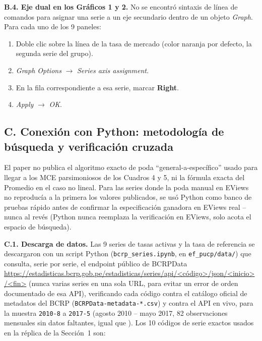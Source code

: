 \documentclass[12pt, letterpaper]{article}
\begin{document}
\textbf{B.4. Eje dual en los Gráficos 1 y 2.} No se encontró sintaxis
de línea de comandos para asignar una serie a un eje secundario dentro
de un objeto \textit{Graph}. Para cada uno de los 9 paneles:
\begin{enumerate}
  \item Doble clic sobre la línea de la tasa de mercado (color naranja
        por defecto, la segunda serie del grupo).
  \item \textit{Graph Options} $\to$ \textit{Series axis assignment}.
  \item En la fila correspondiente a esa serie, marcar \textbf{Right}.
  \item \textit{Apply} $\to$ \textit{OK}.
\end{enumerate}

\subsection*{C. Conexión con Python: metodología de búsqueda y
              verificación cruzada}

El paper no publica el algoritmo exacto de poda ``general-a-específico''
usado para llegar a los MCE parsimoniosos de los Cuadros 4 y 5, ni la
fórmula exacta del Promedio en el caso no lineal. Para las series donde
la poda manual en EViews no reproducía a la primera los valores
publicados, se usó Python como banco de pruebas rápido antes de
confirmar la especificación ganadora en EViews real -- nunca al revés
(Python nunca reemplaza la verificación en EViews, solo acota el
espacio de búsqueda).

\textbf{C.1. Descarga de datos.} Las 9 series de tasas activas y la
tasa de referencia se descargaron con un script Python
(\texttt{bcrp\_series.ipynb}, en \texttt{ef\_pucp/data/}) que consulta,
serie por serie, el endpoint público de BCRPData
\url{https://estadisticas.bcrp.gob.pe/estadisticas/series/api/<código>/json/<inicio>/<fin>}
(nunca varias series en una sola URL, para evitar un error de orden
documentado de esa API), verificando cada código contra el catálogo
oficial de metadatos del BCRP (\texttt{BCRPData-metadata-*.csv}) y
contra el API en vivo, para la muestra \texttt{2010-8} a \texttt{2017-5}
(agosto 2010 -- mayo 2017, 82 observaciones mensuales sin datos
faltantes, igual que \textcite{lahura2017}). Los 10 códigos de serie
exactos usados en la réplica de la Sección~1 son:
\end{document}
